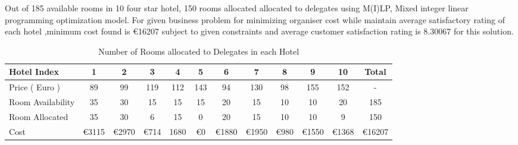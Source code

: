 \documentclass[paper=a4, fontsize=11pt]{scrartcl} %
\begin{document}
Out of 185 available rooms in 10 four star hotel, 150 rooms allocated allocated to delegates using M(I)LP, Mixed integer linear programming optimization model. For given business problem for minimizing organiser cost while maintain average satisfactory rating of each hotel ,minimum cost found is \euro 16207 subject to given constraints and average customer satisfaction rating is 8.30067 for this solution.
\\
\begin{table}[ht]
\centering
\begin{tabular}{@{}lccccccccccc@{}}
\toprule
Hotel Index                             & 1                       & 2                       & 3                        & 4                        & 5                        & 6                       & 7                        & 8                       & 9                        & 10                       & Total                    \\ \midrule
\multicolumn{1}{|l|}{Price ( Euro )}    & \multicolumn{1}{c|}{89} & \multicolumn{1}{c|}{99} & \multicolumn{1}{c|}{119} & \multicolumn{1}{c|}{112} & \multicolumn{1}{c|}{143} & \multicolumn{1}{c|}{94} & \multicolumn{1}{c|}{130} & \multicolumn{1}{c|}{98} & \multicolumn{1}{c|}{155} & \multicolumn{1}{c|}{152} & \multicolumn{1}{c|}{-}   \\ \midrule
\multicolumn{1}{|l|}{Room Availability} & \multicolumn{1}{c|}{35} & \multicolumn{1}{c|}{30} & \multicolumn{1}{c|}{15}  & \multicolumn{1}{c|}{15}  & \multicolumn{1}{c|}{15}  & \multicolumn{1}{c|}{20} & \multicolumn{1}{c|}{15}  & \multicolumn{1}{c|}{10} & \multicolumn{1}{c|}{10}  & \multicolumn{1}{c|}{20}  & \multicolumn{1}{c|}{185} \\ \midrule
\multicolumn{1}{|l|}{Room Allocated}    & \multicolumn{1}{c|}{35} & \multicolumn{1}{c|}{30} & \multicolumn{1}{c|}{6}   & \multicolumn{1}{c|}{15}  & \multicolumn{1}{c|}{0}   & \multicolumn{1}{c|}{20} & \multicolumn{1}{c|}{15}  & \multicolumn{1}{c|}{10} & \multicolumn{1}{c|}{10}  & \multicolumn{1}{c|}{9}   & \multicolumn{1}{c|}{150} \\ \midrule
Cost                            & \euro 3115                    & \euro 2970                    & \euro 714                      & 1680                     &  \euro 0                        & \euro 1880                    & \euro 1950                     & \euro 980                     &  \euro 1550                     & \euro 1368                     & \euro 16207                    \\ \bottomrule
\end{tabular}
\caption{Number of Rooms allocated to Delegates in each Hotel}
\label{my-label}
\end{table}
\end{document}

